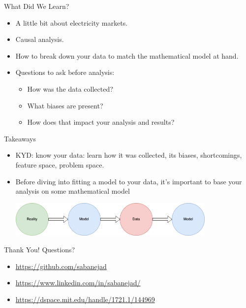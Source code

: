 \documentclass{beamer}
\begin{document}
\begin{frame}{What Did We Learn?}
  \begin{itemize}
    \item<+-> A little bit about electricity markets.
    \item<+-> Causal analysis.
    \item<+-> How to break down your data to match the mathematical model at hand.
    \item<+-> Questions to ask before analysis:
    \begin{itemize}
      \item<+-> How was the data collected? 
      \item<+-> What biases are present?
      \item<+-> How does that impact your analysis and results?
    \end{itemize}
  \end{itemize}
\end{frame}

\begin{frame}{Takeaways}
  \begin{itemize}
    \item<+-> KYD: know your data: learn how it was collected, its biases, shortcomings, feature space, problem space.
    \item<+-> Before diving into fitting a model to your data, it's important to base your analysis on some mathematical model
    \vspace{1cm}
    \begin{center}
    \includegraphics[width=0.8\textwidth]{images/reality-model-data.png}
    \end{center}
  \end{itemize}
\end{frame}

\begin{frame}{Thank You! Questions?}
  \begin{itemize}
  \item \url{https://github.com/sabanejad}
  \item \url{https://www.linkedin.com/in/sabanejad/}
  \item \url{https://dspace.mit.edu/handle/1721.1/144969}
  \end{itemize}
\end{frame}
\end{document}
